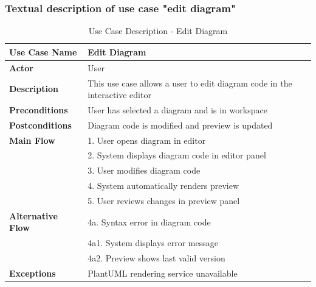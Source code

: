 \subsubsection{Textual description of use case "edit diagram"}
\begin{table}[H]
\centering
\caption{Use Case Description - Edit Diagram}
\begin{tabular}{|l|p{10cm}|}
\hline
\textbf{Use Case Name} & Edit Diagram \\
\hline
\textbf{Actor} & User \\
\hline
\textbf{Description} & This use case allows a user to edit diagram code in the interactive editor \\
\hline
\textbf{Preconditions} & User has selected a diagram and is in workspace \\
\hline
\textbf{Postconditions} & Diagram code is modified and preview is updated \\
\hline
\textbf{Main Flow} & 1. User opens diagram in editor \\
& 2. System displays diagram code in editor panel \\
& 3. User modifies diagram code \\
& 4. System automatically renders preview \\
& 5. User reviews changes in preview panel \\
\hline
\textbf{Alternative Flow} & 4a. Syntax error in diagram code \\
& 4a1. System displays error message \\
& 4a2. Preview shows last valid version \\
\hline
\textbf{Exceptions} & PlantUML rendering service unavailable \\
\hline
\end{tabular}
\end{table}

